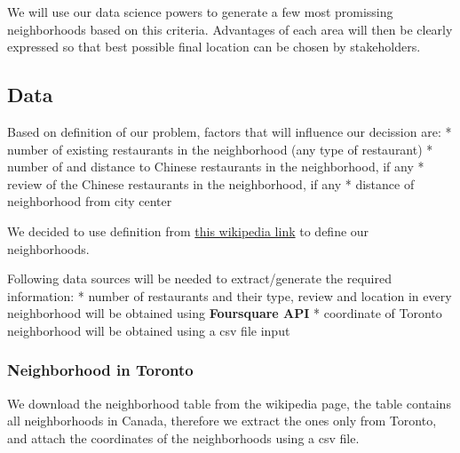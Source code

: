 \documentclass[11pt]{article}
\begin{document}
We will use our data science powers to generate a few most promissing
neighborhoods based on this criteria. Advantages of each area will then
be clearly expressed so that best possible final location can be chosen
by stakeholders.

    \subsection{Data }\label{data}

    Based on definition of our problem, factors that will influence our
decission are: * number of existing restaurants in the neighborhood (any
type of restaurant) * number of and distance to Chinese restaurants in
the neighborhood, if any * review of the Chinese restaurants in the
neighborhood, if any * distance of neighborhood from city center

We decided to use definition from
\href{https://en.wikipedia.org/wiki/List_of_postal_codes_of_Canada:_M}{this
wikipedia link} to define our neighborhoods.

Following data sources will be needed to extract/generate the required
information: * number of restaurants and their type, review and location
in every neighborhood will be obtained using \textbf{Foursquare API} *
coordinate of Toronto neighborhood will be obtained using a csv file
input

    \subsubsection{Neighborhood in Toronto}\label{neighborhood-in-toronto}

We download the neighborhood table from the wikipedia page, the table
contains all neighborhoods in Canada, therefore we extract the ones only
from Toronto, and attach the coordinates of the neighborhoods using a
csv file.
\end{document}
